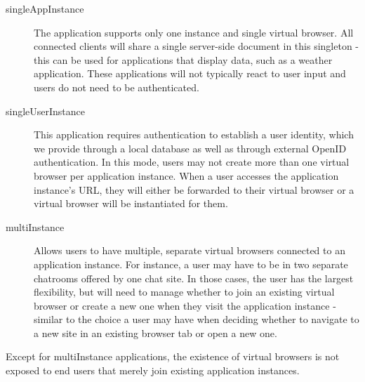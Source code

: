 \begin{description}

\item[singleAppInstance] The application supports only one instance and single virtual browser.
    All connected clients will share a single server-side document in this singleton - this can be
    used for applications that display data, such as a weather application. These applications will not
    typically react to user input and users do not need to be authenticated.

\item[singleUserInstance]  This application requires authentication to establish a
    user identity, which we provide through a local database as well as through external OpenID
    authentication.   In this mode, users may not create more than one virtual browser per
    application instance.  When a user accesses the application instance's URL, they will either
    be forwarded to their virtual browser or a virtual browser will be instantiated for them.

\item[multiInstance]
    Allows users to have multiple, separate virtual browsers connected to an application
    instance. For instance, a user may have to be in two separate chatrooms offered by one chat site.
    In those cases, the user has the largest flexibility, but will need to manage whether
    to join an existing virtual browser or create a new one when they visit the application instance
    - similar to the choice a user may have when deciding whether to navigate to a new site in
    an existing browser tab or open a new one.

\end{description}

Except for multiInstance applications, the existence of virtual browsers is not exposed to
end users that merely join existing application instances.





